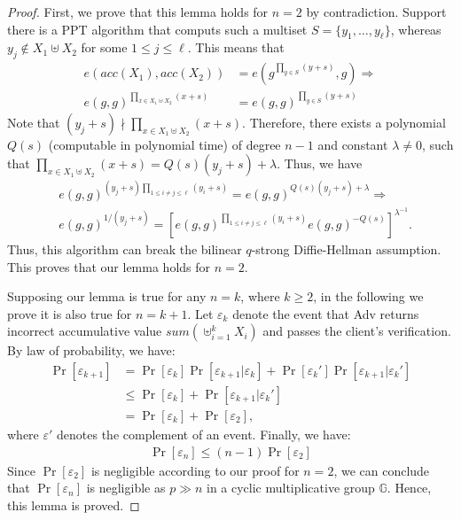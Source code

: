 \begin{proof}
  First, we prove that this lemma holds for $n=2$ by contradiction. Support there is a PPT algorithm that computs such a multiset $S = \{y_1, \dots, y_{\ell}\}$, whereas $y_j \notin X_1 \uplus X_2$ for some $1 \le j \le \ell$. This means that
  \begin{align*}
    e(acc(X_1), acc(X_2)) &= e(g^{\prod_{y \in S} (y+s)}, g) \Rightarrow \\
    {e(g, g)}^{\prod_{x \in X_1 \uplus X_2} (x+s) } &= {e(g, g)}^{\prod_{y \in S} (y+s)}
  \end{align*}
  Note that $(y_j + s)  \nmid \prod_{x \in X_1 \uplus X_2} (x+s)$. Therefore, there exists a polynomial $Q(s)$ (computable in polynomial time) of degree $n-1$ and constant $\lambda \neq 0$, such that $\prod_{x \in X_1 \uplus X_2} (x+s) = Q(s)(y_j + s) + \lambda$. Thus, we have
  \begin{align*}
& {e(g, g)}^{(y_j + s)\prod_{1 \le i \neq j \le \ell} (y_i+s)} = {e(g,g)}^{Q(s)(y_j + s) + \lambda} \Rightarrow \\
& {e(g, g)}^{1/(y_j + s)} = {\left[ {e(g,g)}^{\prod_{1 \le i \neq j \le \ell} (y_i+s)} {e(g,g)}^{-Q(s)} \right]}^{\lambda^{-1}}.
  \end{align*}
  Thus, this algorithm can break the bilinear $q$-strong Diffie-Hellman assumption. This proves that our lemma holds for $n=2$.

  Supposing our lemma is true for any $n=k$, where $k\ge 2$, in the following we prove it is also true for $n=k+1$. Let $\varepsilon_k$ denote the event that \textsf{Adv} returns incorrect accumulative value $sum(\uplus_{i=1}^{k} X_i)$ and passes the client's verification. By law of probability, we have:
  \begin{align*}
    \Pr[\varepsilon_{k+1}] &=  \Pr[\varepsilon_{k}]\Pr[\varepsilon_{k+1} | \varepsilon_{k}] +
    \Pr[\varepsilon_{k}']\Pr[\varepsilon_{k+1} | \varepsilon_{k}']\\
                           &\leq \Pr[\varepsilon_{k}] + \Pr[\varepsilon_{k+1}|\varepsilon_{k}'] \\
                           &= \Pr[\varepsilon_{k}] + \Pr[\varepsilon_{2}],
  \end{align*}
  where $\varepsilon'$ denotes the complement of an event. Finally, we have:
  \begin{align*}
    \Pr[\varepsilon_n] \leq (n-1) \Pr[\varepsilon_2]
  \end{align*}
  Since $\Pr[\varepsilon_2]$ is negligible according to our proof for $n=2$, we can conclude that $\Pr[\varepsilon_{n}]$ is negligible as $p\gg n$ in a cyclic multiplicative group $\mathbb{G}$. Hence, this lemma is proved.
\end{proof}

